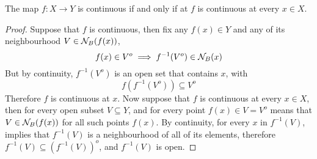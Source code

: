 \documentclass[../../main.tex]{subfiles}
\begin{document}
\begin{wts}
The map $f:X\to Y$ is continuous if and only if at $f$ is continuous at every $x\in X$.
\end{wts}
\begin{proof}
    Suppose that $f$ is continuous, then fix any $f(x)\in Y$ and any of its neighbourhood $V\in\mathcal{N}_B({f(x)})$,
    \[
    f(x)\in V^o\implies f^{-1}(V^o)\in \mathcal{N}_B({x})
    \]
    But by continuity, $f^{-1}(V^o)$ is an open set that contains $x$, with
    \[
    f\left(f^{-1}(V^o)\right)\subseteq V^o
    \]
    Therefore $f$ is continuous at $x$. Now suppose that $f$ is continuous at every $x\in X$, then for every open subset $V\subseteq Y$, and for every point $f(x)\in V=V^o$ means that $V\in\mathcal{N}_B({f(x)})$ for all such points $f(x)$. By continuity, for every $x$ in $f^{-1}(V)$, implies that $f^{-1}(V)$ is a neighbourhood of all of its elements, therefore $f^{-1}(V)\subseteq\left(f^{-1}(V)\right)^o$, and $f^{-1}(V)$ is open.
\end{proof}
\end{document}

